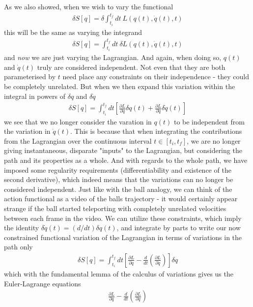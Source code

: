 \documentclass[a4paper]{article}
\begin{document}
    As we also showed, when we wish to vary the functional \begin{align*}
        \delta S[q] = \delta \int _{t_i}^{t_f} dt\ L(q(t), \dot{q}(t), t)
    \end{align*}
    this will be the same as varying the integrand \begin{align*}
        \delta S[q] = \int _{t_i}^{t_f} dt\ \delta L(q(t), \dot{q}(t), t)
    \end{align*}
    and \textit{now} we are just varying the Lagrangian. And again, when doing so, \(q(t)\) and \(\dot{q}(t)\) truly are considered independent. Not even that they are both parameterised by \(t\) need place any constraints on their independence - they could be completely unrelated. But when we then expand this variation within the integral in powers of \(\delta q\) and \(\delta \dot{q} \)  
    \begin{align*}
        \delta S[q] = \int _{t_i}^{t_f} dt \left[ \frac{\partial L}{\partial q}\delta q(t) + \frac{\partial L}{\partial \dot{q} }\delta \dot{q}(t) \right] 
    \end{align*}
    we see that we no longer consider the varation in \(q(t)\) to be independent from the variation in \(\dot{q} (t)\). This is because that when integrating the contributions from the Lagrangian over the continuous interval \(t \in [t_i, t_f]\), we are no longer giving instantaneous, disparate "inputs" to the Lagrangian, but considering the path and its properties as a whole. And with regards to the whole path, we have imposed some regularity requirements (differentiability and existence of the second derivative), which indeed means that the variations can no longer be considered independent. Just like with the ball analogy, we can think of the action functional as a video of the balls trajectory - it would certainly appear strange if the ball started teleporting with completely unrelated velocities between each frame in the video. We can utilize these constraints, which imply the identity \(\delta \dot{q} (t) = (d / dt)\delta q(t)\), and integrate by parts to write our now constrained functional variation of the Lagrangian in terms of variations in the path only \begin{align*}
        \delta S[q] = \int _{t_i}^{t_f} dt \left[ \frac{\partial L}{\partial q} - \frac{d}{dt} \left(  \frac{\partial L}{\partial \dot{q} } \right)\right] \delta q
    \end{align*}
    which with the fundamental lemma of the calculus of variations gives us the Euler-Lagrange equations
    \begin{align*}
        \frac{\partial L}{\partial q} - \frac{d}{dt} \left(  \frac{\partial L}{\partial \dot{q} } \right)
    \end{align*}
\end{document}
